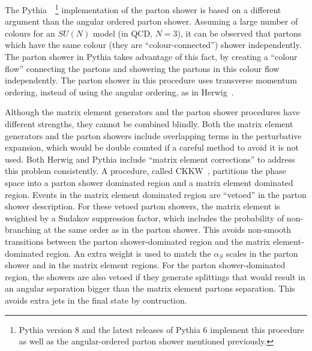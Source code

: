 The Pythia~\cite{pythia}~\footnote{Pythia version 8 and the latest releases of Pythia 6 implement this procedure as well as the angular-ordered parton shower
mentioned previously.} implementation of the parton shower is based on a different argument than the angular ordered parton shower. Assuming a large number of colours
for an $SU(N)$ model (in QCD, $N=3$), it can be observed that partons which have the same colour (they are ``colour-connected'') shower independently.
The parton shower in Pythia takes advantage of this fact, by creating a ``colour flow'' connecting the partons and showering the partons in this colour flow
independently. The parton shower in this procedure uses transverse momentum ordering, instead of using the angular ordering, as in Herwig~\cite{lhc_event_gen}.

Although the matrix element generators and the parton shower procedures have different strengths, they cannot be combined blindly. Both
the matrix element generators and the parton showers include overlapping terms in the perturbative expansion, which would be double counted if a careful
method to avoid it is not used. Both Herwig and Pythia include ``matrix element corrections'' to address this problem consistently. A procedure, called CKKW~\cite{ckkw},
partitions the phase space into a parton shower dominated region and a matrix element dominated region. Events in the matrix element dominated region
are ``vetoed'' in the parton shower description. For these vetoed parton
showers, the matrix element is weighted by a Sudakov suppression factor,
which includes the probability of non-branching at the same order as in
the parton shower. This avoids non-smooth transitions between the parton
shower-dominated region and the matrix element-dominated region.
An extra weight is used to match the $\alpha_S$ scales in the parton shower
and in the matrix element regions.
For the parton shower-dominated region, the showers are also vetoed
if they generate splittings that would result in an angular separation
bigger than the matrix element partons separation. This avoids
extra jets in the final state by contruction.

